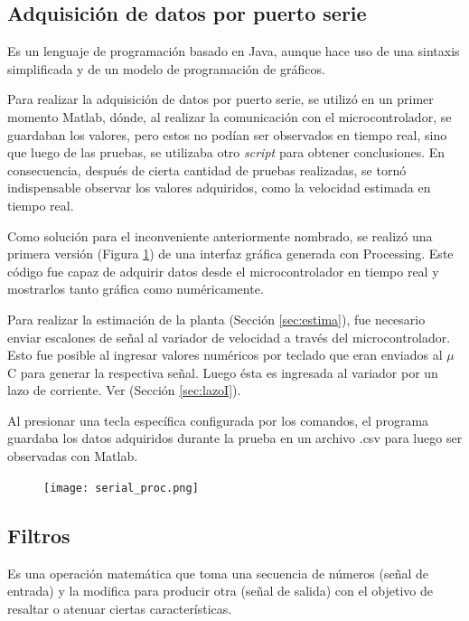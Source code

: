 \subsection{Adquisición de datos por puerto serie}
\begin{tcolorbox}[colback=blue!5!white,colframe=blue!75!black,title=Processing]
	\cite{processing}Es un lenguaje de programación basado en Java, aunque hace uso de una sintaxis simplificada y de un modelo de programación de gráficos.
\end{tcolorbox}
Para realizar la adquisición de datos por puerto serie, se utilizó en un primer momento Matlab, dónde, al realizar la comunicación con el microcontrolador, se guardaban los valores, pero estos no podían ser observados en tiempo real, sino que luego de las pruebas, se utilizaba otro \textit{script} para obtener conclusiones. En consecuencia, después de cierta cantidad de pruebas realizadas, se tornó indispensable observar los valores adquiridos, como la velocidad estimada en tiempo real.

Como solución para el inconveniente anteriormente nombrado, se realizó una primera versión (Figura \ref{fig:Proce}) de una interfaz gráfica generada con Processing. Este código fue capaz de adquirir datos desde el microcontrolador en tiempo real y mostrarlos tanto gráfica como numéricamente. 

Para realizar la estimación de la planta (Sección \ref{sec:estima}), fue necesario enviar escalones de señal al variador de velocidad a través del microcontrolador. Esto fue posible al ingresar valores numéricos por teclado que eran enviados al $\mu$C para generar la respectiva señal. Luego ésta es ingresada al variador por un lazo de corriente. Ver (Sección \ref{sec:lazoI}).

Al presionar una tecla específica configurada por los comandos, el programa guardaba los datos adquiridos durante la prueba en un archivo .csv para luego ser observadas con Matlab.

\begin{figure}[]
	\centering
	\texttt{[image: serial\_proc.png]}
	\label{fig:Proce}    
\end{figure}


\subsection{Filtros}
\begin{tcolorbox}[colback=blue!5!white,colframe=blue!75!black,title=Filtro digital]
Es una operación	matemática que toma una secuencia de números (señal de entrada) y la
	modifica para producir otra (señal de salida) con el objetivo de resaltar o atenuar ciertas características.
\end{tcolorbox}

